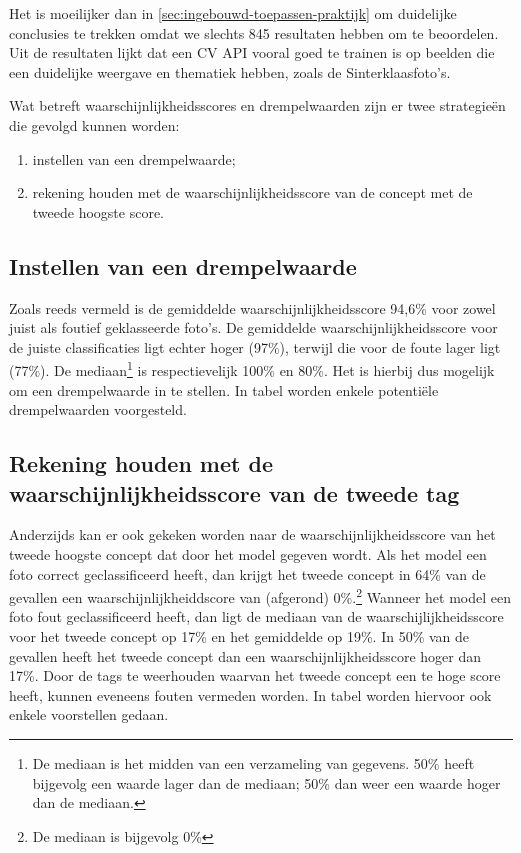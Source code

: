 Het is moeilijker dan in \ref{sec:ingebouwd-toepassen-praktijk} om duidelijke conclusies te trekken omdat we slechts 845 resultaten hebben om te beoordelen. Uit de resultaten lijkt dat een CV API vooral goed te trainen is op beelden die een duidelijke weergave en thematiek hebben, zoals de Sinterklaasfoto’s.

Wat betreft waarschijnlijkheidsscores en drempelwaarden zijn er twee strategieën die gevolgd kunnen worden: 
\begin{enumerate}
        \item instellen van een drempelwaarde;
        \item rekening houden met de waarschijnlijkheidsscore van de concept met de tweede hoogste score.
\end{enumerate}

\subsection{Instellen van een drempelwaarde}
Zoals reeds vermeld is de gemiddelde waarschijnlijkheidsscore 94,6\% voor zowel juist als foutief geklasseerde foto’s. De gemiddelde waarschijnlijkheidsscore voor de juiste classificaties ligt echter hoger (97\%), terwijl die voor de foute lager ligt (77\%). De mediaan\footnote{De mediaan is het midden van een verzameling van gegevens. 50\% heeft bijgevolg een waarde lager dan de mediaan; 50\% dan weer een waarde hoger dan de mediaan.} is respectievelijk 100\% en 80\%. Het is hierbij dus mogelijk om een drempelwaarde in te stellen. In tabel worden enkele potentiële drempelwaarden voorgesteld.  


\subsection{Rekening houden met de waarschijnlijkheidsscore van de tweede tag}
Anderzijds kan er ook gekeken worden naar de waarschijnlijkheidsscore van het tweede hoogste concept dat door het model gegeven wordt. Als het model een foto correct geclassificeerd heeft, dan krijgt het tweede concept in 64\% van de gevallen een waarschijnlijkheiddscore van (afgerond) 0\%.\footnote{De mediaan is bijgevolg 0\%} Wanneer het model een foto fout geclassificeerd heeft, dan ligt de mediaan van de waarschijlijkheidsscore voor het tweede concept op 17\% en het gemiddelde op 19\%. In 50\% van de gevallen heeft het tweede concept dan een waarschijnlijkheidsscore hoger dan 17\%. Door de tags te weerhouden waarvan het tweede concept een te hoge score heeft, kunnen eveneens fouten vermeden worden. In tabel worden hiervoor ook enkele voorstellen gedaan.


